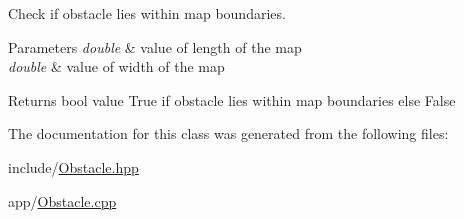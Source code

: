 Check if obstacle lies within map boundaries. 


\begin{DoxyParams}{Parameters}
{\em double} & value of length of the map \\
\hline
{\em double} & value of width of the map\\
\hline
\end{DoxyParams}
\begin{DoxyReturn}{Returns}
bool value True if obstacle lies within map boundaries else False 
\end{DoxyReturn}


The documentation for this class was generated from the following files\+:\begin{DoxyCompactItemize}
\item 
include/\mbox{\hyperlink{_obstacle_8hpp}{Obstacle.\+hpp}}\item 
app/\mbox{\hyperlink{_obstacle_8cpp}{Obstacle.\+cpp}}\end{DoxyCompactItemize}
